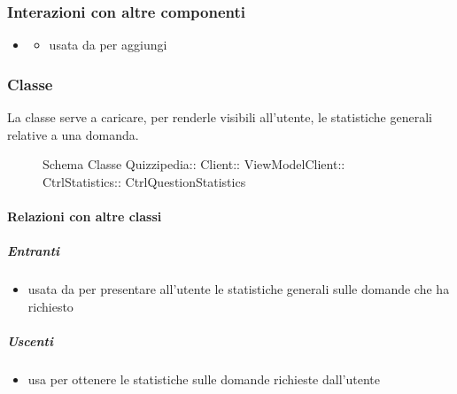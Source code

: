 \subsubsection{Interazioni con altre componenti}
\begin{itemize}
\item {}
\begin{itemize}
\item usata da  per aggiungi
\end{itemize}
\end{itemize}
\subsubsection{Classe }
La classe serve a caricare, per renderle visibili all'utente, le statistiche generali relative a una domanda.
\begin{figure}[H]
\centering
\noindent{}
\caption[Schema Classe CtrlQuestionStatistics]{Schema Classe Quizzipedia:: Client:: ViewModelClient:: CtrlStatistics:: CtrlQuestionStatistics}
\end{figure}
\paragraph{Relazioni con altre classi}
\subparagraph{Entranti}
\begin{itemize}
\item usata da  per presentare all'utente le statistiche generali sulle domande che ha richiesto
\end{itemize}
\subparagraph{Uscenti}
\begin{itemize}
\item usa  per ottenere le statistiche sulle domande richieste dall'utente
\end{itemize}
